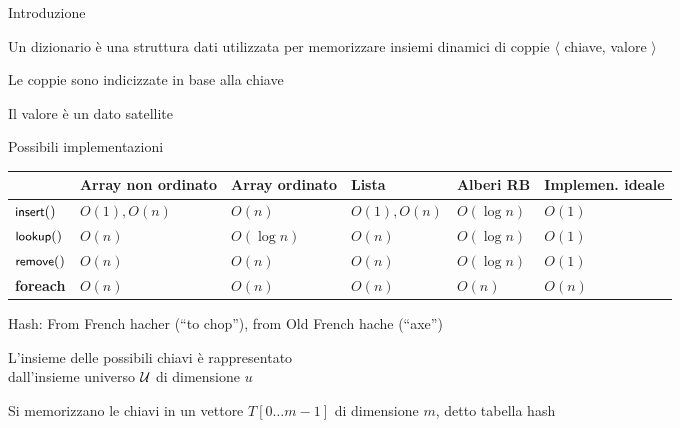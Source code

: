 \begin{frame}{Introduzione}

\vspace{-9pt}
\begin{myboxtitle}[Ripasso]
Un dizionario è una struttura dati utilizzata per memorizzare insiemi dinamici
di \alert{coppie $\langle$ chiave, valore $\rangle$}
\BI
\item Le coppie sono indicizzate in base alla chiave
\item Il valore è un \alert{dato satellite}
\EI
\end{myboxtitle}


\end{frame}

\begin{frame}{Possibili implementazioni}

{\footnotesize
\begin{tabular}{ | P{1.3cm} | P{1.7cm} | P{1.6cm} | P{1.6cm} | P{1.6cm} | P{1.6cm} |}
\hline
& \textbf{Array non ordinato} & 	\textbf{Array ordinato} & \textbf{Lista} & \textbf{Alberi RB} & \textbf{Implemen. ideale} \\\hline
$\textsf{{\small insert}}()$ & $O(1),O(n)$ & $O(n)$ & $O(1), O(n)$ & $O(\log n)$ & $O(1)$ \\\hline
$\textsf{{\small lookup}}()$ & $O(n)$ & $O(\log n)$ &  $O(n)$ &  $O(\log n)$ &  $O(1)$\\\hline
$\textsf{{\small remove}}()$ & $O(n)$ & $O(n)$ & $O(n)$ & $O(\log n)$ & $O(1)$\\\hline
\textbf{foreach} & $O(n)$ & $O(n)$ & $O(n)$ & $O(n)$ & $O(n)$\\\hline
\end{tabular}
}

\begin{myboxtitle}
\BIL
\item Hash: From French \alert{hacher} (“to chop”), from Old French \alert{hache} (“axe”)
\item L'insieme delle possibili chiavi è rappresentato \\dall'\alert{insieme universo} $\cal U$
di dimensione \alert{$u$}
\item Si memorizzano le chiavi in un vettore $T[0 \ldots m-1]$ di dimensione \alert{$m$}, detto \alert{tabella hash}
\EIL
\end{myboxtitle}

\end{frame}

